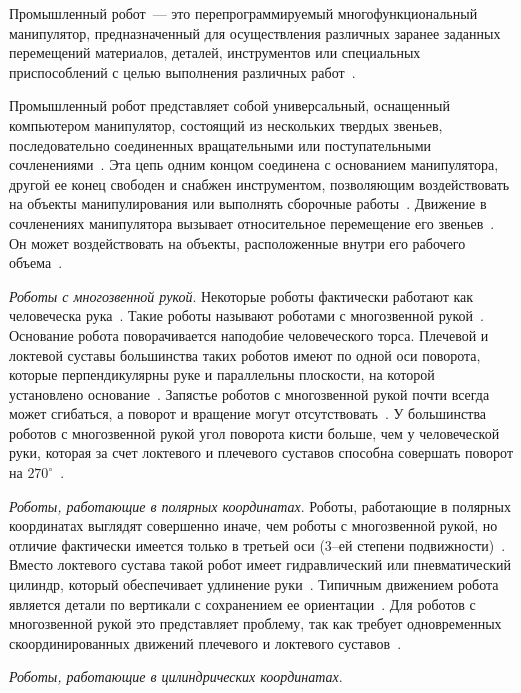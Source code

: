 \documentclass[oneside, final, 14pt]{extarticle}
\begin{document}
Промышленный робот~--- это перепрограммируемый многофункциональный манипулятор, предназначенный для осуществления различных заранее заданных перемещений материалов, деталей, инструментов или специальных приспособлений с целью выполнения различных работ~\cite{fu:rob_tech}.
\par
Промышленный робот представляет собой универсальный, оснащенный компьютером манипулятор, состоящий из нескольких твердых звеньев, последовательно соединенных вращательными или поступательными сочленениями~\cite{fu:rob_tech}.
Эта цепь одним концом соединена с основанием манипулятора, другой ее конец свободен и снабжен инструментом, позволяющим воздействовать на объекты манипулирования или выполнять сборочные работы~\cite{fu:rob_tech}.
Движение в сочленениях манипулятора вызывает относительное перемещение его звеньев~\cite{fu:rob_tech}.
Он может воздействовать на объекты, расположенные внутри его рабочего объема~\cite{fu:rob_tech}.
\par
{\itshape Роботы с многозвенной рукой}.
Некоторые роботы фактически работают как человеческа рука~\cite{asfal:rob_auto}.
Такие роботы называют роботами с многозвенной рукой~\cite{asfal:rob_auto}.
Основание робота поворачивается наподобие человеческого торса.
Плечевой и локтевой суставы большинства таких роботов имеют по одной оси поворота, которые перпендикулярны руке и параллельны плоскости, на которой установлено основание~\cite{asfal:rob_auto}.
Запястье роботов с многозвенной рукой почти всегда может сгибаться, а поворот и вращение могут отсутствовать~\cite{asfal:rob_auto}.
У большинства роботов с многозвенной рукой угол поворота кисти больше, чем у человеческой руки, которая за счет локтевого и плечевого суставов способна совершать поворот на \(270^\circ\)~\cite{asfal:rob_auto}. 
\par
{\itshape Роботы, работающие в полярных координатах}.
Роботы, работающие в полярных координатах выглядят совершенно иначе, чем роботы с многозвенной рукой, но отличие фактически имеется только в третьей оси (3--ей степени подвижности)~\cite{asfal:rob_auto}.
Вместо локтевого сустава такой робот имеет гидравлический или пневматический цилиндр, который обеспечивает удлинение руки~\cite{asfal:rob_auto}.
Типичным  движением робота является детали по вертикали с сохранением ее ориентации~\cite{asfal:rob_auto}.
Для роботов с многозвенной рукой это представляет проблему, так как требует одновременных скоординированных движений плечевого и локтевого суставов~\cite{asfal:rob_auto}.
\par
{\itshape Роботы, работающие в цилиндрических координатах}.
\end{document}
